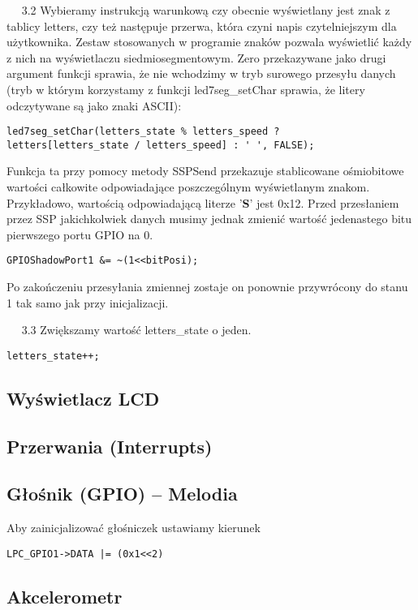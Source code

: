 \documentclass[a4paper,12pt,twoside]{article}
\theoremstyle{plain}
\theoremstyle{definition}
\theoremstyle{remark}
\begin{document}
$\quad$ 3.2 Wybieramy instrukcją warunkową czy obecnie wyświetlany jest znak z tablicy letters, czy też następuje przerwa, która czyni napis czytelniejszym dla użytkownika. Zestaw stosowanych w programie znaków pozwala wyświetlić każdy z nich na wyświetlaczu siedmiosegmentowym. Zero przekazywane jako drugi argument funkcji sprawia, że nie wchodzimy w tryb surowego przesyłu danych (tryb w którym korzystamy z funkcji led7seg\_setChar sprawia, że litery odczytywane są jako znaki ASCII):
\begin{verbatim}
led7seg_setChar(letters_state % letters_speed ?
letters[letters_state / letters_speed] : ' ', FALSE);
\end{verbatim}
Funkcja ta przy pomocy metody SSPSend przekazuje stablicowane ośmiobitowe wartości całkowite odpowiadające poszczególnym wyświetlanym znakom. Przykładowo, wartością odpowiadającą literze '\textbf{S}' jest 0x12. Przed przesłaniem przez SSP jakichkolwiek danych musimy jednak zmienić wartość jedenastego bitu pierwszego portu GPIO na 0. 
\begin{verbatim}
GPIOShadowPort1 &= ~(1<<bitPosi);
\end{verbatim}
Po zakończeniu przesyłania zmiennej zostaje on ponownie przywrócony do stanu 1 tak samo jak przy inicjalizacji.

$\quad$ 3.3 Zwiększamy wartość letters\_state o jeden.
\begin{verbatim}
letters_state++;
\end{verbatim}
\subsection{Wyświetlacz LCD}

\subsection{Przerwania (Interrupts)}

\subsection{Głośnik (GPIO) -- Melodia}
Aby zainicjalizować głośniczek ustawiamy kierunek 
\begin{verbatim}
LPC_GPIO1->DATA |= (0x1<<2)
\end{verbatim}

\subsection{Akcelerometr}
\end{document}
